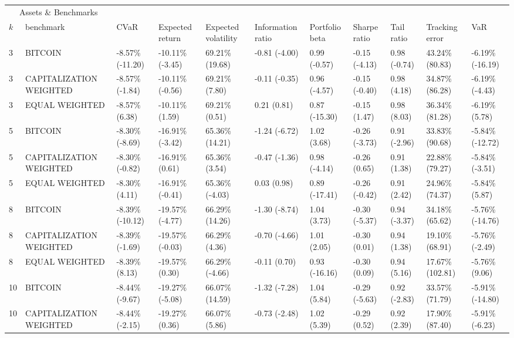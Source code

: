 \documentclass{article}
\begin{document}
\begin{landscape}
\begin{table}[H]
  \centering
  \begin{tabular}{p{0.4cm}|p{3cm}|p{1.65cm}|p{1.65cm}|p{1.65cm}|p{1.65cm}|p{1.65cm}|p{1.65cm}|p{1.65cm}|p{1.65cm}|p{1.65cm}}%
    \toprule
    \multicolumn{2}{c}{Assets \& Benchmarks}                   \\
    \cmidrule(r){1-2}
    $k$ & benchmark & CVaR & Expected return & Expected volatility&Information ratio&Portfolio beta&Sharpe ratio&Tail ratio&Tracking error&VaR\\
    \midrule
    3&BITCOIN&-8.57\% (-11.20)&-10.11\% (-3.45)&69.21\% (19.68)&-0.81 (-4.00)&0.99 (-0.57)&-0.15 (-4.13)&0.98 (-0.74)&43.24\% (80.83)&-6.19\% (-16.19)
\\ 
3&CAPITALIZATION WEIGHTED&-8.57\% (-1.84)&-10.11\% (-0.56)&69.21\% (7.80)&-0.11 (-0.35)&0.96 (-4.57)&-0.15 (-0.40)&0.98 (4.18)&34.87\% (86.28)&-6.19\% (-4.43)
\\ 
3&EQUAL WEIGHTED&-8.57\% (6.38)&-10.11\% (1.59)&69.21\% (0.51)&0.21 (0.81)&0.87 (-15.30)&-0.15 (1.47)&0.98 (8.03)&36.34\% (81.28)&-6.19\% (5.78)
\\ 
5&BITCOIN&-8.30\% (-8.69)&-16.91\% (-3.42)&65.36\% (14.21)&-1.24 (-6.72)&1.02 (3.68)&-0.26 (-3.73)&0.91 (-2.96)&33.83\% (90.68)&-5.84\% (-12.72)
\\ 
5&CAPITALIZATION WEIGHTED&-8.30\% (-0.82)&-16.91\% (0.61)&65.36\% (3.54)&-0.47 (-1.36)&0.98 (-4.14)&-0.26 (0.65)&0.91 (1.38)&22.88\% (79.27)&-5.84\% (-3.51)
\\ 
5&EQUAL WEIGHTED&-8.30\% (4.11)&-16.91\% (-0.41)&65.36\% (-4.03)&0.03 (0.98)&0.89 (-17.41)&-0.26 (-0.42)&0.91 (2.42)&24.96\% (74.37)&-5.84\% (5.87)
\\ 
8&BITCOIN&-8.39\% (-10.12)&-19.57\% (-4.77)&66.29\% (14.26)&-1.30 (-8.74)&1.04 (3.73)&-0.30 (-5.37)&0.94 (-3.37)&34.18\% (65.62)&-5.76\% (-14.76)
\\ 
8&CAPITALIZATION WEIGHTED&-8.39\% (-1.69)&-19.57\% (-0.03)&66.29\% (4.36)&-0.70 (-4.66)&1.01 (2.05)&-0.30 (0.01)&0.94 (1.38)&19.10\% (68.91)&-5.76\% (-2.49)
\\ 
8&EQUAL WEIGHTED&-8.39\% (8.13)&-19.57\% (0.30)&66.29\% (-4.66)&-0.11 (0.70)&0.93 (-16.16)&-0.30 (0.09)&0.94 (5.16)&17.67\% (102.81)&-5.76\% (9.06)
\\ 
10&BITCOIN&-8.44\% (-9.67)&-19.27\% (-5.08)&66.07\% (14.59)&-1.32 (-7.28)&1.04 (5.84)&-0.29 (-5.63)&0.92 (-2.83)&33.57\% (71.79)&-5.91\% (-14.80)
\\ 
10&CAPITALIZATION WEIGHTED&-8.44\% (-2.15)&-19.27\% (0.36)&66.07\% (5.86)&-0.73 (-2.48)&1.02 (5.39)&-0.29 (0.52)&0.92 (2.39)&17.90\% (87.40)&-5.91\% (-6.23)

\end{tabular}
\end{table}
\end{landscape}
\end{document}
